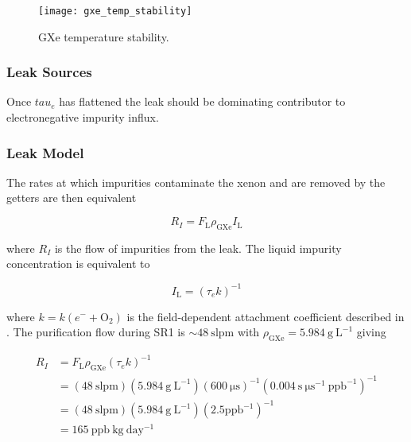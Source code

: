 \begin{figure}
\centering
\texttt{[image: gxe\_temp\_stability]}
\caption{GXe temperature stability.}
\label{fig:electron_lifetime_model_outgassing_gxe_temp}
\end{figure}



\subsubsection{Leak Sources}
\label{subsubsec:electron_lifetime_model_outgassing_leak_sources}
Once $tau_e$ has flattened the leak should be dominating contributor to electronegative impurity influx.



\subsubsection{Leak Model}
\label{subsubsec:electron_lifetime_model_outgassing_leak_model}
The rates at which impurities
contaminate the xenon and are removed by the getters are then equivalent

\begin{equation}
R_I = F_{\mathrm{L}} \rho_{\mathrm{GXe}} I_{\mathrm{L}}
\end{equation}

\noindent where $R_I$ is the flow of impurities from the leak.  The liquid impurity concentration is equivalent to

\begin{equation}
I_{\mathrm{L}} = ( \tau_e k)^{-1}
\end{equation}

\noindent where $k = k(e^- + \mathrm{O_2})$ is the field-dependent \electron attachment coefficient described in
.  The purification flow during SR1 is ${\sim} 48\ \mathrm{slpm}$ with
$\rho_{\mathrm{GXe}} = 5.984\ \mathrm{g\ L^{-1}}$ giving

\begin{equation}
\begin{aligned}
R_I &= F_{\mathrm{L}} \rho_{\mathrm{GXe}} (\tau_e k)^{-1} \\
&= (48\ \mathrm{slpm}) (5.984\ \mathrm{g\ L^{-1}}) (600\ \mathrm{\mu s})^{-1} (0.004\ \mathrm{s\ \mu s^{-1}\ ppb^{-1}})^{-1} \\
&= (48\ \mathrm{slpm}) (5.984\ \mathrm{g\ L^{-1}}) (2.5 \mathrm{ppb^{-1}})^{-1} \\
&= 165\ \mathrm{ppb\ kg\ day^{-1}}
\label{eq:electron_lifetime_model_outgassing_leak}
\end{aligned}
\end{equation}

